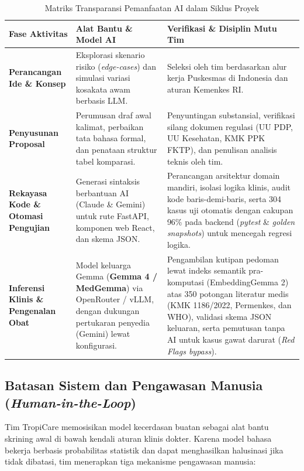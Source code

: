 \begin{table}[H]
\centering
\footnotesize
\caption{Matriks Transparansi Pemanfaatan AI dalam Siklus Proyek}\label{tab:transparansi_ai}
\vspace{3pt}
\begin{tabularx}{\textwidth}{p{3.2cm} X X}
\toprule
\textbf{Fase Aktivitas} & \textbf{Alat Bantu \& Model AI} & \textbf{Verifikasi \& Disiplin Mutu Tim} \\
\midrule
\textbf{Perancangan Ide \& Konsep} & Eksplorasi skenario risiko (\textit{edge-cases}) dan simulasi variasi kosakata awam berbasis LLM. & Seleksi oleh tim berdasarkan alur kerja Puskesmas di Indonesia dan aturan Kemenkes RI. \\
\midrule
\textbf{Penyusunan Proposal} & Perumusan draf awal kalimat, perbaikan tata bahasa formal, dan penataan struktur tabel komparasi. & Penyuntingan substansial, verifikasi silang dokumen regulasi (UU PDP, UU Kesehatan, KMK PPK FKTP), dan penulisan analisis teknis oleh tim. \\
\midrule
\textbf{Rekayasa Kode \& Otomasi Pengujian} & Generasi sintaksis berbantuan AI (Claude \& Gemini) untuk rute FastAPI, komponen web React, dan skema JSON. & Perancangan arsitektur domain mandiri, isolasi logika klinis, audit kode baris-demi-baris, serta 304 kasus uji otomatis dengan cakupan 96\% pada backend (\textit{pytest} \& \textit{golden snapshots}) untuk mencegah regresi logika. \\
\midrule
\textbf{Inferensi Klinis \& Pengenalan Obat} & Model keluarga Gemma (\textbf{Gemma 4 / MedGemma}) via OpenRouter / vLLM, dengan dukungan pertukaran penyedia (Gemini) lewat konfigurasi. & Pengambilan kutipan pedoman lewat indeks semantik pra-komputasi (EmbeddingGemma 2) atas 350 potongan literatur medis (KMK 1186/2022, Permenkes, dan WHO), validasi skema JSON keluaran, serta pemutusan tanpa AI untuk kasus gawat darurat (\textit{Red Flags bypass}). \\
\bottomrule
\end{tabularx}
\end{table}

\subsection{Batasan Sistem dan Pengawasan Manusia (\textit{Human-in-the-Loop})}

Tim TropiCare memosisikan model kecerdasan buatan sebagai alat bantu skrining awal di bawah kendali aturan klinis dokter. Karena model bahasa bekerja berbasis probabilitas statistik dan dapat menghasilkan halusinasi jika tidak dibatasi, tim menerapkan tiga mekanisme pengawasan manusia:

